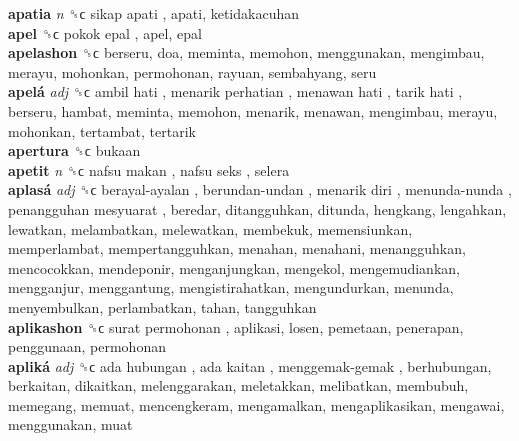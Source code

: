 \textbf{apatia} \emph{n}  ␝ϲ   sikap apati , apati, ketidakacuhan  \\
\textbf{apel} ␝ϲ   pokok epal , apel, epal  \\
\textbf{apelashon} ␝ϲ  berseru, doa, meminta, memohon, menggunakan, mengimbau, merayu, mohonkan, permohonan, rayuan, sembahyang, seru  \\
\textbf{apelá} \emph{adj}  ␝ϲ   ambil hati ,  menarik perhatian ,  menawan hati ,  tarik hati , berseru, hambat, meminta, memohon, menarik, menawan, mengimbau, merayu, mohonkan, tertambat, tertarik  \\
\textbf{apertura} ␝ϲ  bukaan  \\
\textbf{apetit} \emph{n}  ␝ϲ   nafsu makan ,  nafsu seks , selera  \\
\textbf{aplasá} \emph{adj}  ␝ϲ   berayal-ayalan ,  berundan-undan ,  menarik diri ,  menunda-nunda ,  penangguhan mesyuarat , beredar, ditangguhkan, ditunda, hengkang, lengahkan, lewatkan, melambatkan, melewatkan, membekuk, memensiunkan, memperlambat, mempertangguhkan, menahan, menahani, menangguhkan, mencocokkan, mendeponir, menganjungkan, mengekol, mengemudiankan, mengganjur, menggantung, mengistirahatkan, mengundurkan, menunda, menyembulkan, perlambatkan, tahan, tangguhkan  \\
\textbf{aplikashon} ␝ϲ   surat permohonan , aplikasi, losen, pemetaan, penerapan, penggunaan, permohonan  \\
\textbf{apliká} \emph{adj}  ␝ϲ   ada hubungan ,  ada kaitan ,  menggemak-gemak , berhubungan, berkaitan, dikaitkan, melenggarakan, meletakkan, melibatkan, membubuh, memegang, memuat, mencengkeram, mengamalkan, mengaplikasikan, mengawai, menggunakan, muat  \\
